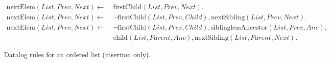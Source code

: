 \documentclass[twocolumn,10pt]{article}
\begin{document}
\begin{figure*}
\begin{align*}
\\
    \mathrm{nextElem}(\mathit{List}, \mathit{Prev}, \mathit{Next}) \leftarrow\; &
    \mathrm{firstChild}(\mathit{List}, \mathit{Prev}, \mathit{Next}).
\\
    \mathrm{nextElem}(\mathit{List}, \mathit{Prev}, \mathit{Next}) \leftarrow\; &
    \neg\mathrm{firstChild}(\mathit{List}, \mathit{Prev}, \mathit{Child}),
    \mathrm{nextSibling}(\mathit{List}, \mathit{Prev}, \mathit{Next}).
\\
    \mathrm{nextElem}(\mathit{List}, \mathit{Prev}, \mathit{Next}) \leftarrow\; &
    \neg\mathrm{firstChild}(\mathit{List}, \mathit{Prev}, \mathit{Child}),
    \mathrm{siblinglessAncestor}(\mathit{List}, \mathit{Prev}, \mathit{Anc}), \\&
    \mathrm{child}(\mathit{List}, \mathit{Parent}, \mathit{Anc}),
    \mathrm{nextSibling}(\mathit{List}, \mathit{Parent}, \mathit{Next}).
\end{align*}
\caption{Datalog rules for an ordered list (insertion only).}
\end{figure*}

{\footnotesize

{}}
\end{document}
